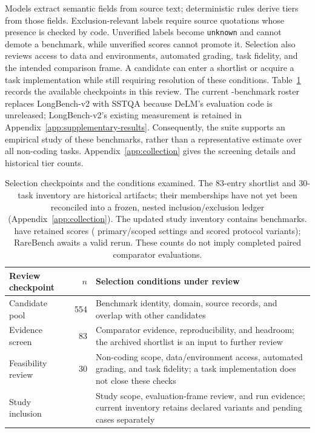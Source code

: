 Models extract semantic fields from source text; deterministic rules derive tiers from those
fields. Exclusion-relevant labels require source quotations whose presence is checked by code.
Unverified labels become \texttt{unknown} and cannot demote a benchmark, while unverified scores
cannot promote it. Selection also reviews access to data and environments, automated grading,
task fidelity, and the intended comparison frame. A candidate can enter a shortlist or acquire
a task implementation while still requiring resolution of these conditions. Table~\ref{tab:funnel}
records the available checkpoints in this review. The current \StudyBenchmarkCount{}-benchmark
roster replaces LongBench-v2 with SSTQA because DeLM's evaluation code is unreleased;
LongBench-v2's existing measurement is retained in Appendix~\ref{app:supplementary-results}.
Consequently, the suite supports an empirical study of these \StudyBenchmarkCount{}
benchmarks, rather than a representative estimate over all non-coding tasks. Appendix~\ref{app:collection}
gives the screening details and historical tier counts.

\begin{table}[t]
\centering
\small
\begin{tabular}{@{}lrp{}@{}}
\toprule
Review checkpoint & $n$ & Selection conditions under review \\
\midrule
Candidate pool & 554 & Benchmark identity, domain, source records, and overlap with other candidates \\
Evidence screen & 83 & Comparator evidence, reproducibility, and headroom; the archived shortlist is an input to further review \\
Feasibility review & 30 & Non-coding scope, data/environment access, automated grading, and task fidelity; a task implementation does not close these checks \\
Study inclusion & \StudyBenchmarkCount{} & Study scope, evaluation-frame review, and run evidence; current inventory retains declared variants and pending cases separately \\
\bottomrule
\end{tabular}
\caption{Selection checkpoints and the conditions examined. The 83-entry shortlist and 30-task
inventory are historical artifacts; their memberships have not yet been reconciled into a frozen,
nested inclusion/exclusion ledger (Appendix~\ref{app:collection}). The updated study inventory
contains \StudyBenchmarkCount{} benchmarks.
\RetainedCodexCount{} have retained scores (\PrimaryCodexCount{} primary/scoped settings and
\VariantCodexCount{} scored protocol variants); RareBench awaits a valid rerun.
These counts do not imply completed paired comparator evaluations.}
\label{tab:funnel}
\end{table}

